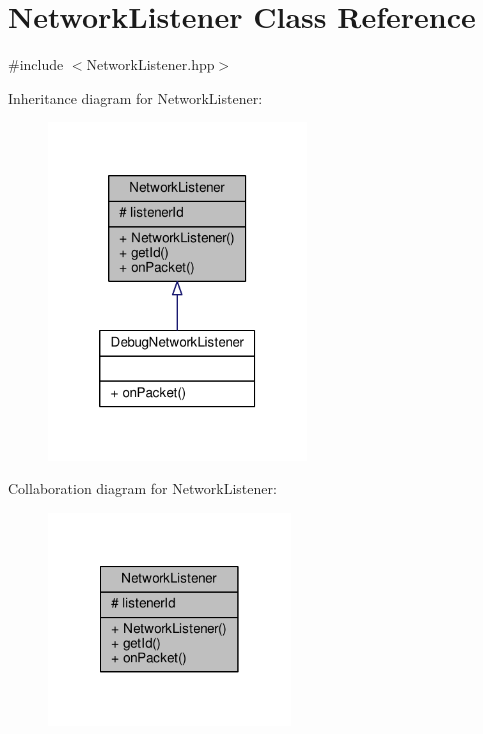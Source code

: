 \hypertarget{class_network_listener}{\section{Network\-Listener Class Reference}
\label{class_network_listener}
}


{\ttfamily \#include $<$Network\-Listener.\-hpp$>$}



Inheritance diagram for Network\-Listener\-:
\nopagebreak
\begin{figure}[H]
\begin{center}
\leavevmode
\includegraphics[width=194pt]{class_network_listener__inherit__graph}
\end{center}
\end{figure}


Collaboration diagram for Network\-Listener\-:
\nopagebreak
\begin{figure}[H]
\begin{center}
\leavevmode
\includegraphics[width=182pt]{class_network_listener__coll__graph}
\end{center}
\end{figure}
